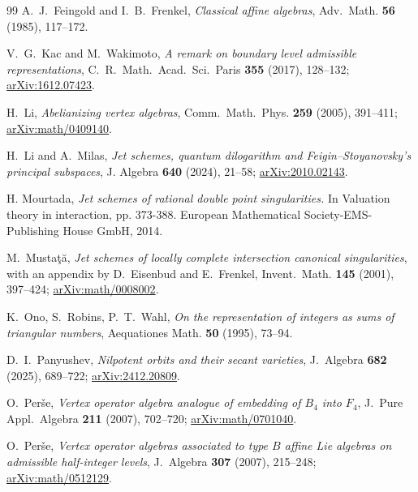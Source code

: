\documentclass[11pt]{amsart}
\theoremstyle{definition}
\theoremstyle{remark}
\begin{document}
\begin{thebibliography}{99}
A.~J.~Feingold and I.~B.~Frenkel,
\emph{Classical affine algebras},
Adv.~Math. \textbf{56} (1985), 117--172.


V.~G.~Kac and M.~Wakimoto,
\emph{A remark on boundary level admissible representations},
C.~R.~Math.~Acad.~Sci.~Paris \textbf{355} (2017), 128--132;
\href{https://arxiv.org/abs/1612.07423}{arXiv:1612.07423}.

H.~Li,
\emph{Abelianizing vertex algebras},
Comm.~Math.~Phys. \textbf{259} (2005), 391--411;
\href{https://arxiv.org/abs/math/0409140}{arXiv:math/0409140}.


H.~Li and A.~Milas,
\emph{Jet schemes, quantum dilogarithm and
	Feigin--Stoyanovsky's principal subspaces},
J. Algebra \textbf{640} (2024), 21--58;
\href{https://arxiv.org/abs/2010.02143}{arXiv:2010.02143}.

 H. Mourtada, \emph{Jet schemes of rational double point singularities.} In Valuation theory in interaction, pp. 373-388. European Mathematical Society-EMS-Publishing House GmbH, 2014.


M.~Musta\c{t}\u{a},
\emph{Jet schemes of locally complete intersection canonical singularities},
with an appendix by D.~Eisenbud and E.~Frenkel,
Invent.~Math. \textbf{145} (2001), 397--424;
\href{https://arxiv.org/abs/math/0008002}{arXiv:math/0008002}.

 K.~Ono, S.~Robins, P.~T.~Wahl, \emph{On the representation of integers as sums of triangular
	numbers}, Aequationes Math. \textbf{50} (1995), 73--94.


D.~I.~Panyushev,
\emph{Nilpotent orbits and their secant varieties},
J.~Algebra \textbf{682} (2025), 689--722;
\href{https://arxiv.org/abs/2412.20809}{arXiv:2412.20809}.




O.~Per\v se,
\emph{Vertex operator algebra analogue of embedding of
	$B_4$ into $F_4$},
J.~Pure Appl.~Algebra \textbf{211} (2007), 702--720;
\href{https://arxiv.org/abs/math/0701040}{arXiv:math/0701040}.

O.~Per\v se,
\emph{Vertex operator algebras associated to type $B$ affine Lie algebras
	on admissible half-integer levels},
J.~Algebra \textbf{307} (2007), 215--248;
\href{https://arxiv.org/abs/math/0512129}{arXiv:math/0512129}.


\end{thebibliography}
\end{document}
